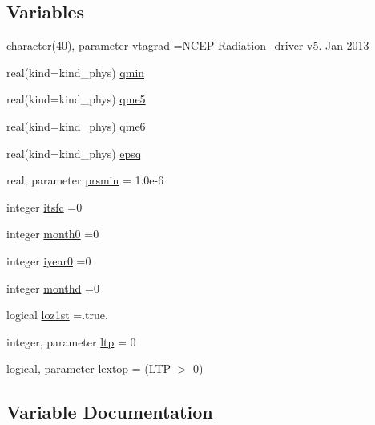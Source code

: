 \subsection*{Variables}
\begin{DoxyCompactItemize}
\item 
character(40), parameter \hyperlink{namespacemodule__radiation__driver_a70a36595385cf1f5794f9c5859e52ab6}{vtagrad} =\textquotesingle{}N\+C\+EP-\/Radiation\+\_\+driver v5. Jan 2013 \textquotesingle{}
\item 
real(kind=kind\+\_\+phys) \hyperlink{group__module__radiation__driver_gafdc2a7e1dbfb075ac33a2388564d9428}{qmin}
\item 
real(kind=kind\+\_\+phys) \hyperlink{group__module__radiation__driver_gab671cb80142c71dab5f41f01ccdcc088}{qme5}
\item 
real(kind=kind\+\_\+phys) \hyperlink{group__module__radiation__driver_ga4916e37c472b2f824b6f566ff67200cd}{qme6}
\item 
real(kind=kind\+\_\+phys) \hyperlink{group__module__radiation__driver_ga0b0bf0fa8723b80d0891ec3327d187d7}{epsq}
\item 
real, parameter \hyperlink{group__module__radiation__driver_ga3fc43ca0d2c5f69a380ddb4f0926ecc7}{prsmin} = 1.\+0e-\/6
\item 
integer \hyperlink{group__module__radiation__driver_ga9ee6a89464bf206cc07ea30d7eeaaeb8}{itsfc} =0
\item 
integer \hyperlink{group__module__radiation__driver_ga6eb268f296c77047f389ed6fac5f95be}{month0} =0
\item 
integer \hyperlink{group__module__radiation__driver_ga4d755de48d0aa83f337a2a907ac7d8a2}{iyear0} =0
\item 
integer \hyperlink{group__module__radiation__driver_gac4baf8ff048aaa5b85d03cc42c579c7b}{monthd} =0
\item 
logical \hyperlink{group__module__radiation__driver_gaf6e0e1ef2ebb78f57c897ebaf633edd2}{loz1st} =.true.
\item 
integer, parameter \hyperlink{group__module__radiation__driver_gaab2535e9906afd709124056f4ca1e470}{ltp} = 0
\item 
logical, parameter \hyperlink{group__module__radiation__driver_gad27b36d0186c8147fe839eb5c268d157}{lextop} = (L\+TP $>$ 0)
\end{DoxyCompactItemize}


\subsection{Variable Documentation}
